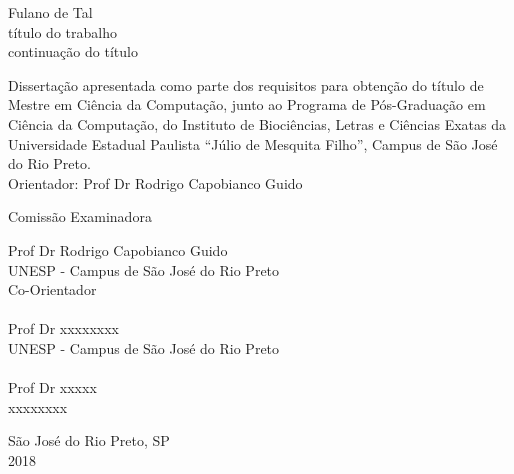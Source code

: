 \documentclass[a4paper,12pt,openright,oneside]{book}
\begin{document}
\newpage
\thispagestyle{empty}
\begin{center}
\vspace{4cm}
\fontsize{14}{\baselineskip} \selectfont
\vspace{30.0pt}
{Fulano de Tal} \\ \vspace{30.0pt}
{t\'{i}tulo do trabalho} \\ \onehalfspacing \fontsize{14}{\baselineskip} \selectfont
{continua\c{c}\~{a}o do t\'{i}tulo} \\
\par \null
\begin{flushright}
\parbox{3.50in}{
\fontsize{12}{\baselineskip} \selectfont \onehalfspacing
Disserta\c c\~ao apresentada como parte dos requisitos para obten\c c\~ao do t\'itulo de Mestre em Ci\^encia da Computa\c c\~ao, junto ao Programa de P\'os-Gradua\c c\~ao em Ci\^encia da Computa\c c\~ao, do Instituto de Bioci\^encias, Letras e Ci\^encias Exatas da Universidade Estadual Paulista ``J\'ulio de Mesquita Filho'', Campus de S\~ao Jos\'e do Rio Preto. \\ \vspace{1.0pt}
{Orientador: Prof Dr Rodrigo Capobianco Guido} \\ \vspace{1.0pt}
}
\end{flushright}
\fontsize{14}{\baselineskip} \selectfont
Comiss\~ao Examinadora \\  \vspace{1.0pt}
\end{center}
\fontsize{14}{\baselineskip} \selectfont
Prof Dr Rodrigo Capobianco Guido \\ 
UNESP -  Campus de S\~ao Jos\'e do Rio Preto \\
Co-Orientador \\\\
Prof Dr xxxxxxxx \\ 
UNESP -  Campus de S\~ao Jos\'e do Rio Preto \\\\
Prof Dr xxxxx \\
xxxxxxxx \\
\vspace{3.0cm}
\begin{center}
S\~ao Jos\'e do Rio Preto, SP  \\ \vspace{1.0pt}
2018
\end{center}
\setlength{\parindent}{0pt}
\end{document}
